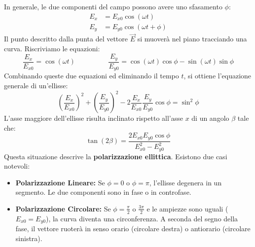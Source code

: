 \documentclass[openany,a4paper,12pt]{book}
\begin{document}
In generale, le due componenti del campo possono avere uno sfasamento $\phi$:
\begin{align*}
    E_x &= E_{x0} \cos(\omega t) \\
    E_y &= E_{y0} \cos(\omega t + \phi)
\end{align*}
Il punto descritto dalla punta del vettore $\vec{E}$ si muoverà nel piano tracciando una curva. Riscriviamo le equazioni:
\[
\frac{E_x}{E_{x0}} = \cos(\omega t) \hspace{2cm} \frac{E_y}{E_{y0}} = \cos(\omega t)\cos\phi - \sin(\omega t)\sin\phi
\]
Combinando queste due equazioni ed eliminando il tempo $t$, si ottiene l'equazione generale di un'ellisse:
\begin{equation}
    \left(\frac{E_x}{E_{x0}}\right)^2 + \left(\frac{E_y}{E_{y0}}\right)^2 - 2 \frac{E_x}{E_{x0}} \frac{E_y}{E_{y0}} \cos\phi = \sin^2 \phi
\end{equation}
L'asse maggiore dell'ellisse risulta inclinato rispetto all'asse $x$ di un angolo $\beta$ tale che:
\[
\tan(2\beta) = \frac{2 E_{x0} E_{y0} \cos\phi}{E_{x0}^2 - E_{y0}^2}
\]
Questa situazione descrive la \textbf{polarizzazione ellittica}. Esistono due casi notevoli:
\begin{itemize}
    \item \textbf{Polarizzazione Lineare:} Se $\phi = 0$ o $\phi = \pi$, l'ellisse degenera in un segmento. Le due componenti sono in fase o in controfase.
    \item \textbf{Polarizzazione Circolare:} Se $\phi = \frac{\pi}{2}$ o $\frac{3\pi}{2}$ e le ampiezze sono uguali ($E_{x0} = E_{y0}$), la curva diventa una circonferenza. A seconda del segno della fase, il vettore ruoterà in senso orario (circolare destra) o antiorario (circolare sinistra).
\end{itemize}
\end{document}
